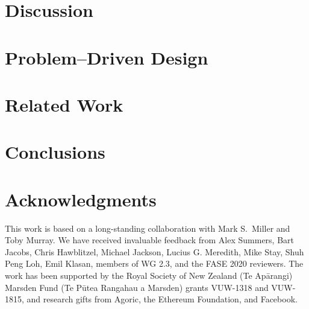 \documentclass[acmsmall]{acmart}
\newcommand{\sophia}[1]{#1} %
\newcommand{\susan}[1]{#1} %
\begin{document}
\section{Discussion}
\label{sect:discussion} 


\section{Problem--Driven Design}
\label{sect:problemdriven} 


\section{Related Work}
\label{sect:related}


\section{Conclusions}
\label{sect:conclusion}


\section{Acknowledgments}

\sophia{This work is based on a long-standing collaboration with Mark
  S.\ Miller and Toby Murray.
We have received invaluable feedback from Alex Summers, Bart Jacobs,  Chris Hawblitzel,
Michael Jackson, Lucius G. Meredith,
Mike Stay, Shuh Peng Loh,  Emil Klasan, members of WG 2.3, 
and the FASE 2020  reviewers.
The work has been supported by the 
Royal Society of New Zealand (Te Ap\={a}rangi) Marsden Fund (Te P\={u}tea Rangahau a Marsden)
grants VUW-1318 and VUW-1815, and research gifts from Agoric\susan{, the Ethereum Foundation,} and
Facebook.}








\end{document}
